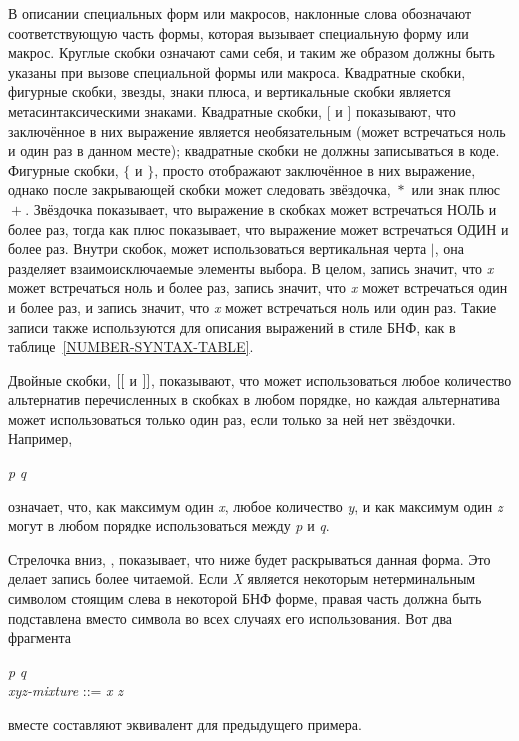 В описании специальных форм или макросов, наклонные слова обозначают
соответствующую часть формы, которая вызывает специальную форму или макрос.
Круглые скобки означают сами себя, и таким же образом должны быть указаны при
вызове специальной формы или макроса.
Квадратные скобки, фигурные скобки, звезды, знаки плюса, и вертикальные скобки
является метасинтаксическими знаками.
Квадратные скобки,
$\lbrack$ и $\rbrack$ показывают, что заключённое в них выражение является
необязательным (может встречаться ноль и один раз в данном месте); квадратные
скобки не должны записываться в коде.
Фигурные скобки, $\lbrace$ и $\rbrace$, просто отображают заключённое в них
выражение, однако после закрывающей скобки может следовать звёздочка, ${}*$ или
знак плюс ${}+$. Звёздочка показывает, что выражение в скобках может
встречаться НОЛЬ и более раз, тогда как плюс показывает, что выражение может
встречаться ОДИН и более раз. Внутри скобок, может использоваться вертикальная
черта $|$, она разделяет взаимоисключаемые элементы выбора.
В целом, запись  значит, что \emph{x} может встречаться ноль и
более раз, запись  значит, что \emph{x} может встречаться один и
более раз, и запись  значит, что \emph{x} может встречаться ноль или
один раз. Такие записи также используются для описания выражений в стиле БНФ,
как в таблице~\ref{NUMBER-SYNTAX-TABLE}.

Двойные скобки, $\lbrack\lbrack$ и $\rbrack\rbrack$, показывают, что может использоваться
любое количество альтернатив перечисленных в скобках в любом порядке, но каждая
альтернатива может использоваться только один раз, если только за ней нет
звёздочки.
Например,
\begin{tabbing}
\emph{p}  \emph{q}
\end{tabbing}
означает, что, как максимум один \emph{x}, любое количество \emph{y}, и как максимум
один \emph{z} могут в любом порядке использоваться между \emph{p} и \emph{q}.

Стрелочка вниз, \Mind{}, показывает, что ниже будет раскрываться данная
форма. Это делает запись \Mchoice{~} более читаемой. Если \emph{X} является
некоторым нетерминальным символом стоящим слева в некоторой БНФ форме, правая
часть должна быть подставлена вместо символа  во всех случаях его
использования. Вот два фрагмента

\begin{tabbing}
\emph{p}  \emph{q} \\
\emph{xyz-mixture} ::= \emph{x\/} {\Mor}  {\Mor} \emph{z\/}
\end{tabbing}
вместе составляют эквивалент для предыдущего примера.

